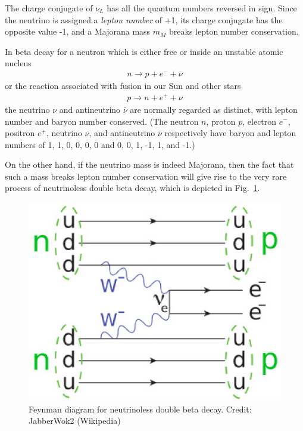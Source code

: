 \documentclass[12pt]{iopart}
\begin{document}
The charge conjugate of $\nu_L$ has all the quantum numbers reversed in sign. Since the neutrino is assigned a \textit{lepton number} of +1, its charge conjugate has the opposite value -1, and a Majorana mass $m_{M}$ breaks lepton number conservation.

In beta decay for a neutron which is either free or inside an unstable atomic nucleus
\begin{eqnarray}
n \rightarrow p + e^- + \bar{\nu}
\label{eq1.4}
\end{eqnarray}
or the reaction associated with fusion in our Sun and other stars
\begin{eqnarray}
p \rightarrow n + e^+ + \nu
\label{eq1.5}
\end{eqnarray}
the neutrino $\nu$ and antineutrino $\bar{\nu}$ are normally regarded as distinct, with lepton number and baryon number conserved. (The neutron $n$, proton $p$, electron $e^-$, positron $e^+$, neutrino $\nu$, and antineutrino $\bar{\nu}$ respectively have baryon and lepton numbers of 1, 1, 0, 0, 0, 0 and 0, 0, 1, -1, 1, and -1.) 

On the other hand, if the neutrino mass is indeed Majorana, then the fact that such a mass breaks lepton number conservation will give rise to the very rare process of neutrinoless double beta decay, which is depicted in Fig.~\ref{Fig8-double-beta.eps}. 
\begin{figure}[htbp]
\centering
\includegraphics[bb=0 0 360 270, width=5in]{Fig8-double-beta.eps}
\caption{Feynman diagram for neutrinoless double beta decay. Credit: JabberWok2 (Wikipedia) \label{Fig8-double-beta.eps}}
\end{figure}
\end{document}

